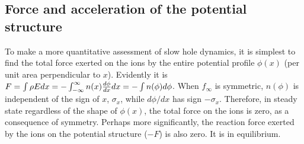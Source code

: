 \documentclass[12pt]{article}
\begin{document}
\subsection{Force and acceleration of the potential structure}

To make a more quantitative assessment of slow hole dynamics, it is
simplest to find the total force exerted on the ions by the entire
potential profile $\phi(x)$ (per unit area perpendicular to
$x$). Evidently it is
$F=\int \rho Edx=-\int_{-\infty}^{\infty} n(x) {d\phi\over dx}dx
=-\int n(\phi) d\phi$. When $f_\infty$ is symmetric, $n(\phi)$ is
independent of the sign of $x$, $\sigma_x$, while $d\phi/dx$ has sign
$-\sigma_x$. Therefore, in steady state regardless of the shape of
$\phi(x)$, the total force on the ions is zero, as a consequence of
symmetry. Perhaps more significantly, the reaction force exerted by
the ions on the potential structure ($-F$) is also zero. It is in
equilibrium.
\end{document}
